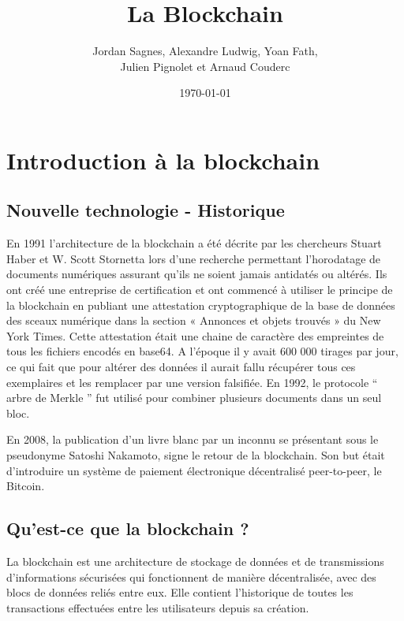 \documentclass[12pt, a4paper, oneside]{book}
\title{La Blockchain}
\author{ Jordan Sagnes, Alexandre Ludwig, Yoan Fath, \\ Julien Pignolet et Arnaud Couderc}
\date{\today}
\begin{document}
\maketitle
 
    \frontmatter
    
    
    \tableofcontents
    \thispagestyle{empty}
    \mainmatter

    \chapter{Introduction à la blockchain}
    \section{Nouvelle technologie - Historique}
    En 1991 l’architecture de la blockchain a été décrite par les chercheurs Stuart Haber et W. Scott Stornetta lors d’une recherche permettant l’horodatage de documents numériques assurant qu’ils ne soient jamais antidatés ou altérés. 
	Ils ont créé une entreprise de certification et ont commencé à utiliser le principe de la blockchain en publiant une attestation cryptographique de la base de données des sceaux numérique dans la section « Annonces et objets trouvés » du New York Times. Cette attestation était une chaine de caractère des empreintes de tous les fichiers encodés en base64. A l’époque il y avait 600 000 tirages par jour, ce qui fait que pour altérer des données il aurait fallu récupérer tous ces exemplaires et les remplacer par une version falsifiée.  
	En 1992, le protocole \hyphenquote{french}{ arbre de Merkle } fut utilisé pour combiner plusieurs documents dans un seul bloc. 


En 2008, la publication d’un livre blanc par un inconnu se présentant sous le pseudonyme Satoshi Nakamoto, signe le retour de la blockchain. Son but était d’introduire un système de paiement électronique décentralisé peer-to-peer, le Bitcoin.
    \section{Qu'est-ce que la blockchain ?}
    La blockchain est une architecture de stockage de données et de transmissions d’informations sécurisées qui fonctionnent de manière décentralisée, avec des blocs de données reliés entre eux. Elle contient l’historique de toutes les transactions effectuées entre les utilisateurs depuis sa création. 
\end{document}
